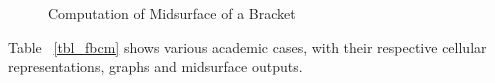 \begin{figure}[!h]
	\caption{Computation of Midsurface of a Bracket}
	\label{fig_midsdorm}
	\end{figure}

Table ~\ref{tbl_fbcm} shows various academic cases, with their respective cellular representations, graphs and midsurface outputs.

